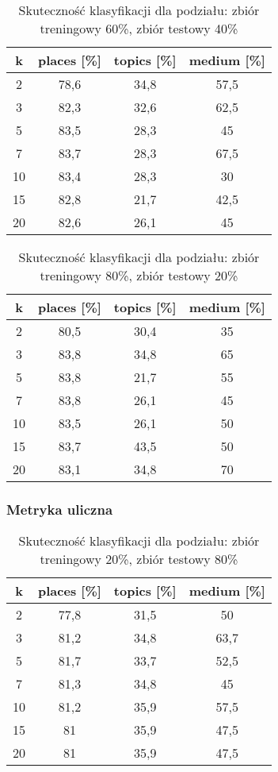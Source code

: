 \documentclass{classrep}
\begin{document}
\begin{table}[H]
	\centering
	\begin{tabular}{c c c c} 
		\hline
		\textbf{k} & \textbf{places [\%]} & \textbf{topics [\%]} &  \textbf{medium [\%]} \\ [0.5ex] 
		\hline
		\hline 
2 & 78,6 & 34,8 & 57,5 \\ 
3 & 82,3 & 32,6 & 62,5 \\ 
5 & 83,5 & 28,3 & 45 \\ 
7 & 83,7 & 28,3 & 67,5 \\ 
10 & 83,4 & 28,3 & 30 \\ 
15 & 82,8 & 21,7 & 42,5 \\ 
20 & 82,6 & 26,1 & 45 \\ 
		\hline
	\end{tabular}
	\caption{Skuteczność klasyfikacji dla podziału: zbiór treningowy 60\%, zbiór testowy 40\%}
\end{table}

\begin{table}[H]
	\centering
	\begin{tabular}{c c c c} 
		\hline
		\textbf{k} & \textbf{places [\%]} & \textbf{topics [\%]} &  \textbf{medium [\%]} \\ [0.5ex] 
		\hline
		\hline 
2 & 80,5 & 30,4 & 35 \\ 
3 & 83,8 & 34,8 & 65 \\ 
5 & 83,8 & 21,7 & 55 \\ 
7 & 83,8 & 26,1 & 45 \\ 
10 & 83,5 & 26,1 & 50 \\ 
15 & 83,7 & 43,5 & 50 \\ 
20 & 83,1 & 34,8 & 70 \\ 
		\hline
	\end{tabular}
	\caption{Skuteczność klasyfikacji dla podziału: zbiór treningowy 80\%, zbiór testowy 20\%}
\end{table}

\subsubsection{Metryka uliczna}
\begin{table}[H]
	\centering
	\begin{tabular}{c c c c} 
		\hline
		\textbf{k} & \textbf{places [\%]} & \textbf{topics [\%]} &  \textbf{medium [\%]} \\ [0.5ex] 
		\hline
		\hline 
2 & 77,8 & 31,5 & 50 \\ 
3 & 81,2 & 34,8 & 63,7 \\ 
5 & 81,7 & 33,7 & 52,5 \\ 
7 & 81,3 & 34,8 & 45 \\ 
10 & 81,2 & 35,9 & 57,5 \\ 
15 & 81 & 35,9 & 47,5 \\ 
20 & 81 & 35,9 & 47,5 \\ 
		\hline
	\end{tabular}
	\caption{Skuteczność klasyfikacji dla podziału: zbiór treningowy 20\%, zbiór testowy 80\%}
\end{table}
\end{document}

